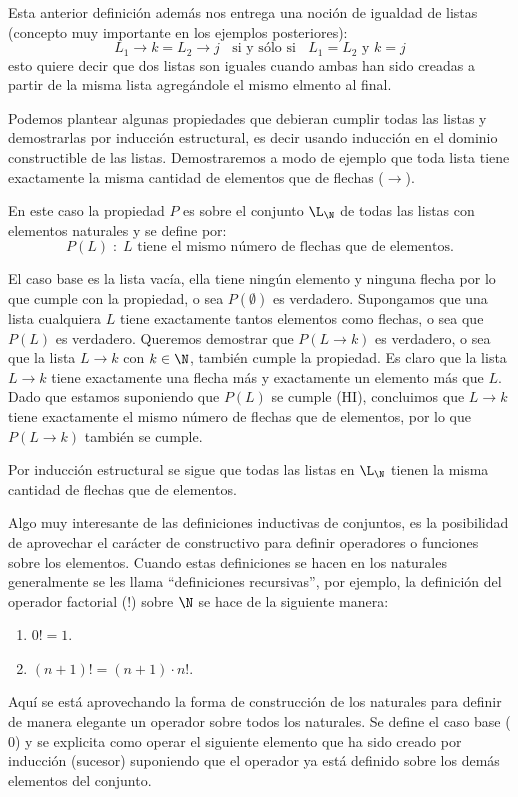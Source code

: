 \begin{ejemplo}
Esta anterior definición además nos entrega una noción de igualdad de listas (concepto muy importante en los ejemplos posteriores):
\[
L_1\rightarrow k = L_2\rightarrow j \;\;\text{ si y sólo si }\;\; L_1=L_2 \text{ y } k=j
\]
esto quiere decir que dos listas son iguales cuando ambas han sido creadas a partir de la misma lista agregándole el mismo elmento al final.

Podemos plantear algunas propiedades que debieran cumplir todas las listas y demostrarlas por inducción estructural, es decir usando inducción en el dominio constructible de las listas.
Demostraremos a modo de ejemplo que toda lista tiene exactamente la misma cantidad de elementos que de flechas ($\rightarrow$).

\begin{demostracion}
En este caso la propiedad $P$ es sobre el conjunto $\L_\N$ de todas las listas con elementos naturales y se define por:
\[
P(L)\;:\;L\text{ tiene el mismo número de flechas que de elementos.}
\]
\begin{inducciondemo}
\BI El caso base es la lista vacía, ella tiene ningún elemento y ninguna flecha por lo que cumple con la propiedad, o sea $P(\emptyset)$ es verdadero.
\HI Supongamos que una lista cualquiera $L$ tiene exactamente tantos elementos como flechas, o sea que $P(L)$ es verdadero.
\TI Queremos demostrar que $P(L\rightarrow k)$ es verdadero, o sea que la lista $L\rightarrow k$ con $k\in\N$, también cumple la propiedad.
Es claro que la lista $L\rightarrow k$ tiene exactamente una flecha más y exactamente un elemento más que $L$.
Dado que estamos suponiendo que $P(L)$ se cumple (HI), concluimos que $L\rightarrow k$ tiene exactamente el mismo número de flechas que de elementos, por lo que $P(L\rightarrow k)$ también se cumple.
\end{inducciondemo}
Por inducción estructural se sigue que todas las listas en $\L_\N$ tienen la misma cantidad de flechas que de elementos.
\end{demostracion}
\end{ejemplo}

Algo muy interesante de las definiciones inductivas de conjuntos, es la posibilidad de aprovechar el carácter de constructivo para definir operadores o funciones sobre los elementos.
Cuando estas definiciones se hacen en los naturales generalmente se les llama ``definiciones recursivas'', por ejemplo, la definición del operador factorial ($!$) sobre $\N$ se hace de la siguiente manera:
\begin{enumerate}
\itemsep 0pt
\item $0!=1$.
\item $(n+1)!=(n+1)\cdot n!$.
\end{enumerate}
Aquí se está aprovechando la forma de construcción de los naturales para definir de manera elegante un operador sobre todos los naturales.
Se define el caso base ($0$) y se explicita como operar el siguiente elemento que ha sido creado por inducción (sucesor) suponiendo que el operador ya está definido sobre los demás elementos del conjunto.

